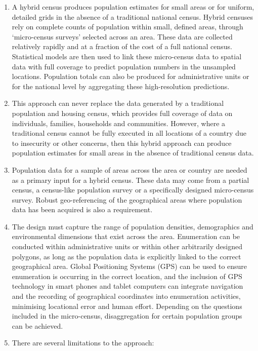 \documentclass[
]{article}
\begin{document}
\begin{enumerate}
\def\labelenumi{\arabic{enumi}.}
\setcounter{enumi}{101}
\item
  A hybrid census produces population estimates for small areas or
  for uniform, detailed grids in the absence of a traditional national
  census. Hybrid censuses rely on complete counts of population within
  small, defined areas, through `micro-census surveys' selected across
  an area. These data are collected relatively rapidly and at a
  fraction of the cost of a full national census. Statistical models
  are then used to link these micro-census data to spatial data with
  full coverage to predict population numbers in the unsampled
  locations. Population totals can also be produced for administrative
  units or for the national level by aggregating these high-resolution
  predictions.
\item
  This approach can never replace the data generated by a traditional
  population and housing census, which provides full coverage of data
  on individuals, families, households and communities. However, where
  a traditional census cannot be fully executed in all locations of a
  country due to insecurity or other concerns, then this hybrid
  approach can produce population estimates for small areas in the
  absence of traditional census data.
\item
  Population data for a sample of areas across the area or country
  are needed as a primary input for a hybrid census. These data may
  come from a partial census, a census-like population survey or a
  specifically designed micro-census survey. Robust geo-referencing of
  the geographical areas where population data has been acquired is
  also a requirement.
\item
  The design must capture the range of population densities,
  demographics and environmental dimensions that exist across the
  area. Enumeration can be conducted within administrative units or
  within other arbitrarily designed polygons, as long as the
  population data is explicitly linked to the correct geographical
  area. Global Positioning Systems (GPS) can be used to ensure
  enumeration is occurring in the correct location, and the inclusion
  of GPS technology in smart phones and tablet computers can integrate
  navigation and the recording of geographical coordinates into
  enumeration activities, minimising locational error and human
  effort. Depending on the questions included in the micro-census,
  disaggregation for certain population groups can be achieved.
\item
  There are several limitations to the approach:
\end{enumerate}
\end{document}
